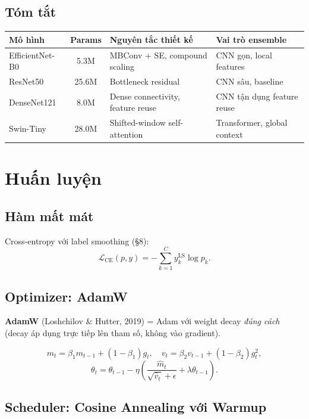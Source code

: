 \documentclass[11pt,a4paper]{article}
\begin{document}
\subsection{Tóm tắt}

\begin{table}[h]
\centering\small
\begin{tabular}{lcll}
\toprule
\textbf{Mô hình} & \textbf{Params} & \textbf{Nguyên tắc thiết kế} & \textbf{Vai trò ensemble} \\
\midrule
EfficientNet-B0 & 5.3M  & MBConv + SE, compound scaling     & CNN gọn, local features \\
ResNet50        & 25.6M & Bottleneck residual                & CNN sâu, baseline \\
DenseNet121     & 8.0M  & Dense connectivity, feature reuse  & CNN tận dụng feature reuse \\
Swin-Tiny       & 28.0M & Shifted-window self-attention      & Transformer, global context \\
\bottomrule
\end{tabular}
\end{table}

\section{Huấn luyện}

\subsection{Hàm mất mát}

Cross-entropy với label smoothing (\S 8):
\[
  \mathcal{L}_{\text{CE}}(p, y) = -\sum_{k=1}^C y^{\text{LS}}_k \log p_k.
\]

\subsection{Optimizer: AdamW}

\textbf{AdamW} (Loshchilov \& Hutter, 2019) = Adam với weight decay \textit{đúng cách} (decay áp dụng trực tiếp lên tham số, không vào gradient).

\[
  m_t = \beta_1 m_{t-1} + (1 - \beta_1) g_t, \quad
  v_t = \beta_2 v_{t-1} + (1 - \beta_2) g_t^2,
\]
\[
  \theta_t = \theta_{t-1} - \eta \left( \frac{\hat{m}_t}{\sqrt{\hat{v}_t} + \epsilon} + \lambda \theta_{t-1} \right).
\]

\subsection{Scheduler: Cosine Annealing với Warmup}
\end{document}
